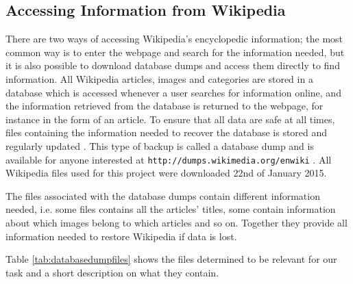 
\subsection{Accessing Information from Wikipedia}
\label{sec:accessing_information_from_wikipedia}
There are two ways of accessing Wikipedia’s encyclopedic information; the most common way is to enter the webpage and search for the information needed, but it is also possible to download database dumps and access them directly to find information. All Wikipedia articles, images and categories are stored in a database which is accessed whenever a user searches for information online, and the information retrieved from the database is returned to the webpage, for instance in the form of an article. To ensure that all data are safe at all times, files containing the information needed to recover the database is stored and regularly updated \cite{wiki:databasedownload}. This type of backup is called a database dump and is available for anyone interested at \texttt{http://dumps.wikimedia.org/enwiki} \cite{databasedownload}. All Wikipedia files used for this project were downloaded 22nd of January 2015. 

The files associated with the database dumps contain different information needed, i.e. some files contains all the articles' titles, some contain information about which images belong to which articles and so on. Together they provide all information needed to restore Wikipedia if data is lost. 


Table \ref{tab:databasedumpfiles} shows the files determined to be relevant for our task and a short description on what they contain. 




